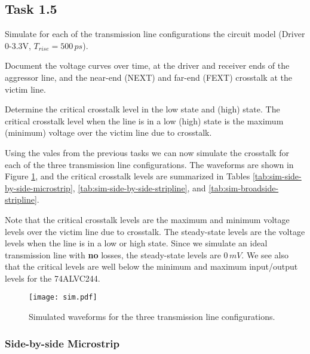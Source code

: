 \documentclass[../main.tex]{subfiles}
\begin{document}
\subsection{Task 1.5}

Simulate for each of the transmission line configurations the circuit model (Driver 0-3.3V, $T_{rise} = 500\,\si{ps}$).

\vspace{10pt}
Document the voltage curves over time, at the driver and receiver ends of the aggressor line, and the near-end (NEXT) and far-end (FEXT) crosstalk at the victim line.

\vspace{10pt}
Determine the critical crosstalk level in the low state and (high) state. The critical crosstalk level when the line is in a low (high) state is the maximum (minimum) voltage over the victim line due to crosstalk.

\solution

Using the vales from the previous tasks we can now simulate the crosstalk for each of the three transmission line configurations. The waveforms are shown in Figure \ref{fig:waveforms}, and the critical crosstalk levels are summarized in Tables \ref{tab:sim-side-by-side-microstrip}, \ref{tab:sim-side-by-side-stripline}, and \ref{tab:sim-broadside-stripline}.

\vspace{10pt}
Note that the critical crosstalk levels are the maximum and minimum voltage levels over the victim line due to crosstalk. The steady-state levels are the voltage levels when the line is in a low or high state. Since we simulate an ideal transmission line with \textbf{no} losses, the steady-state levels are $0\,\si{mV}$. We see also that the critical levels are well below the minimum and maximum input/output levels for the 74ALVC244.

\begin{figure}[h]
    \centering
    \texttt{[image: sim.pdf]}
    \caption{Simulated waveforms for the three transmission line configurations.}
    \label{fig:waveforms}
\end{figure}

\newpage

\subsubsection{Side-by-side Microstrip}
\end{document}
